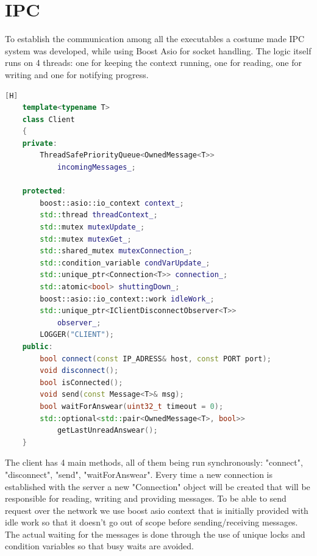 \documentclass[17pt]{report}
\begin{document}
\pagebreak
\section{IPC}
\indent \indent
To establish the communication among all the executables a costume made IPC system
was developed, while using Boost Asio for socket handling. The logic 
itself runs on 4 threads: one for keeping the context running, one for reading,
one for writing and one for notifying progress.

\begin{lstlisting}[caption={Client template}, language = C++][H]
    template<typename T>
    class Client
    {
    private:
        ThreadSafePriorityQueue<OwnedMessage<T>>
            incomingMessages_;

    protected:
        boost::asio::io_context context_;
        std::thread threadContext_;
        std::mutex mutexUpdate_;
        std::mutex mutexGet_;
        std::shared_mutex mutexConnection_;
        std::condition_variable condVarUpdate_;
        std::unique_ptr<Connection<T>> connection_;
        std::atomic<bool> shuttingDown_;
        boost::asio::io_context::work idleWork_; 
        std::unique_ptr<IClientDisconnectObserver<T>> 
            observer_; 
        LOGGER("CLIENT");
    public:
        bool connect(const IP_ADRESS& host, const PORT port);
        void disconnect();
        bool isConnected();
        void send(const Message<T>& msg);
        bool waitForAnswear(uint32_t timeout = 0);
        std::optional<std::pair<OwnedMessage<T>, bool>>
            getLastUnreadAnswear();
    }
\end{lstlisting}

The client has 4 main methods, all of them being run synchronously:
"connect", "disconnect", "send", "waitForAnswear". Every time a 
new connection is established with the server a new "Connection"
object will be created that will be responsible for reading, writing 
and providing messages. To be able to send request over the network
we use boost asio context that is initially provided with idle work 
so that it doesn't go out of scope before sending/receiving messages. 
The actual waiting for the messages is done through the use of unique 
locks and condition variables so that busy waits are avoided.
\pagebreak
\end{document}
